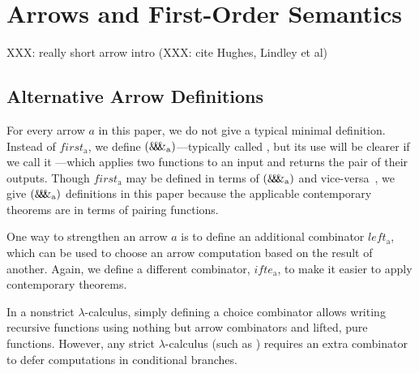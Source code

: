 \documentclass[preprint]{sigplanconf}
\newcommand{\pto}{\rightharpoonup}
\newcommand{\arrowpair}{\ensuremath{\mathit{\&\mspace{-7.5mu}\&\mspace{-7.5mu}\&}}}
\newcommand{\arrowif}{\ensuremath{ifte}}
\newcommand{\gen}{_\mathrm{a}}
\begin{document}
\begin{comment}
XXX: Probabilities of output sets are preimage measures: if $f \in A \pto B$ is $\A-\B$-measurable and $\P \in \A \to [0,1]$, then
\begin{equation}
	\P~(preimage~f~B)
\end{equation}
is the probability of $B$.

XXX: more explanation, and an example
\end{comment}


\section{Arrows and First-Order Semantics}

XXX: really short arrow intro (XXX: cite Hughes, Lindley et al)

\subsection{Alternative Arrow Definitions}

For every arrow $a$ in this paper, we do not give a typical minimal definition.
Instead of $first\gen$, we define $(\arrowpair\gen)$---typically called , but its use will be clearer if we call it ---which applies two functions to an input and returns the pair of their outputs.
Though $first\gen$ may be defined in terms of $(\arrowpair\gen)$ and vice-versa~\cite{cit:hughes-2005afp-arrows}, we give $(\arrowpair\gen)$ definitions in this paper because the applicable contemporary theorems are in terms of pairing functions.

One way to strengthen an arrow $a$ is to define an additional combinator $left\gen$, which can be used to choose an arrow computation based on the result of another.
Again, we define a different combinator, $\arrowif\gen$, to make it easier to apply contemporary theorems.

In a nonstrict $\lambda$-calculus, simply defining a choice combinator allows writing recursive functions using nothing but arrow combinators and lifted, pure functions.
However, any strict $\lambda$-calculus (such as \lzfclang) requires an extra combinator to defer computations in conditional branches.
\end{document}
